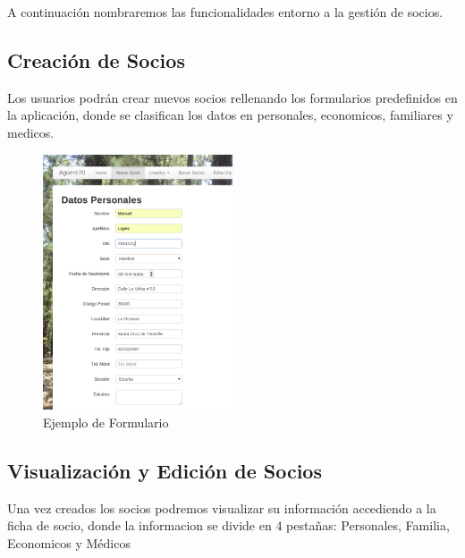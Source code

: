 A continuación nombraremos las funcionalidades entorno a la gestión de socios.

\subsection{Creación de Socios}

Los usuarios podrán crear nuevos socios rellenando los formularios predefinidos en la aplicación, donde se clasifican los datos en personales, economicos, familiares y medicos.\\

\begin{figure}[H]
\begin{center}
\includegraphics[width=0.5\textwidth]{images/ejemplo_formulario_personal.jpg}
\caption{Ejemplo de Formulario}
\label{fig:ArbolBinario}
\end{center}
\end{figure}

\subsection{Visualización y Edición de Socios}

Una vez creados los socios podremos visualizar su información accediendo a la ficha de socio, donde la informacion se divide en 4 pestañas: Personales, Familia, Economicos y Médicos \\

